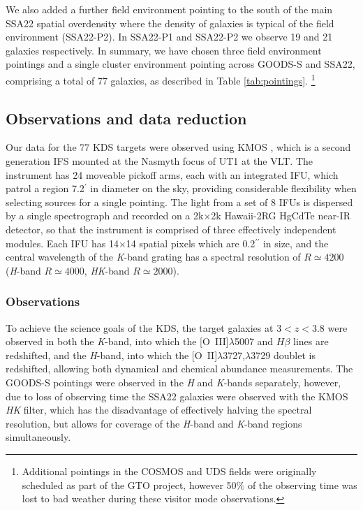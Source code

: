 \documentclass[fleqn,usenatbib]{mnras}
\begin{document}
We also added a further field environment pointing to the south of the main SSA22 spatial overdensity where the density of galaxies is typical of the field environment (SSA22-P2).
In SSA22-P1 and SSA22-P2 we observe 19 and 21 galaxies respectively.
In summary, we have chosen three field environment pointings and a single cluster environment pointing across GOODS-S and SSA22, comprising a total of 77 galaxies, as described in Table \ref{tab:pointings}. \footnote{Additional pointings in the COSMOS and UDS fields were originally scheduled as part of the GTO project, however 50$\%$ of the observing time was lost to bad weather during these visitor mode observations.}

\subsection{Observations and data reduction}\label{subsubsec:observations_and_dr}

Our data for the 77 KDS targets were observed using KMOS \citep{Sharples2013}, which is a second generation IFS mounted at the Nasmyth focus of UT1 at the VLT.
The instrument has 24 moveable pickoff arms, each with an integrated IFU, which patrol a region 7.2$^{\prime}$ in diameter on the sky, providing considerable flexibility when selecting sources for a single pointing.
The light from a set of 8 IFUs is dispersed by a single spectrograph and recorded on a 2k$\times$2k Hawaii-2RG HgCdTe near-IR detector, so that the instrument is comprised of three effectively independent modules.
Each IFU has 14$\times$14 spatial pixels which are 0.2$^{\prime\prime}$ in size, and the central wavelength of the {\it K}-band grating has a spectral resolution of $R\simeq4200$ ({\it H}-band $R\simeq4000$, {\it HK}-band $R\simeq2000$).
\subsubsection{Observations}\label{subsubsec:Obs}

To achieve the science goals of the KDS, the target galaxies at $3 < z < 3.8$ were observed in both the {\it K}-band, into which the [O~{\sc III}]$\lambda$5007 and $H\beta$ lines are redshifted, and the {\it H}-band, into which the [O~{\sc II}]$\lambda$3727,$\lambda$3729 doublet is redshifted, allowing both dynamical and chemical abundance measurements.
The GOODS-S pointings were observed in the {\it H} and {\it K}-bands separately, however, due to loss of observing time the SSA22 galaxies were observed with the KMOS {\it HK} filter, which has the disadvantage of effectively halving the spectral resolution, but allows for coverage of the {\it H}-band and {\it K}-band regions simultaneously. \\
\end{document}

